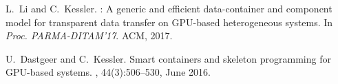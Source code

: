 

L.~Li and C.~Kessler.
: A generic and efficient data-container and component
  model for transparent data transfer on {GPU}-based heterogeneous systems.
\newblock In {\em Proc. PARMA-DITAM'17}. ACM, 2017.

U.\ Dastgeer and C.\ Kessler.
\newblock Smart containers and skeleton programming for {GPU}-based systems.
, 44(3):506--530, June 2016.

